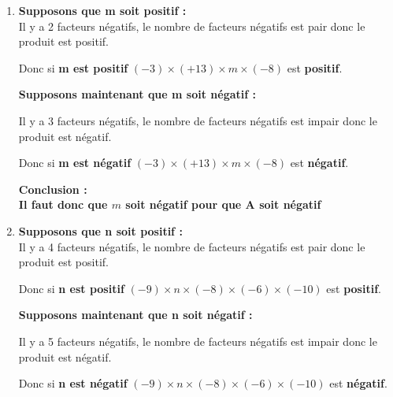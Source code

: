 \begin{corrige}
    \phantom{rrr}    
        \begin{enumerate}
            \item {\bfseries \color[HTML]{f15929}Supposons que m soit positif : }\\
            Il y a 2 facteurs négatifs, le nombre de facteurs négatifs est pair donc le produit est positif.
           
           \medskip
            Donc si {\bfseries \color{black}m est positif} $ (-3) \times (+13)\times m\times (-8) $ est {\bfseries \color{black}positif}.
           
           \medskip
            {\bfseries \color[HTML]{f15929}Supposons maintenant que m soit négatif : }
           
           \medskip
            Il y a 3 facteurs négatifs, le nombre de facteurs négatifs est impair donc le produit est négatif.
           
           \medskip
            Donc si {\bfseries \color{black}m est négatif} $ (-3) \times (+13)\times m\times (-8) $ est {\bfseries \color{black}négatif}.
           
           \medskip
            {\bfseries \color[HTML]{f15929}Conclusion :} \\
           {\bfseries \color{black}Il faut donc que $ m $ soit négatif pour que A soit négatif}
               \item {\bfseries \color[HTML]{f15929}Supposons que n soit positif : }\\
            Il y a 4 facteurs négatifs, le nombre de facteurs négatifs est pair donc le produit est positif.
           
           \medskip
            Donc si {\bfseries \color{black}n est positif} $ (-9) \times n\times (-8)\times (-6)\times (-10) $ est {\bfseries \color{black}positif}.
           
           \medskip
            {\bfseries \color[HTML]{f15929}Supposons maintenant que n soit négatif : }
           
           \medskip
            Il y a 5 facteurs négatifs, le nombre de facteurs négatifs est impair donc le produit est négatif.
           
           \medskip
            Donc si {\bfseries \color{black}n est négatif} $ (-9) \times n\times (-8)\times (-6)\times (-10) $ est {\bfseries \color{black}négatif}.
           

\end{enumerate}
\end{corrige}
